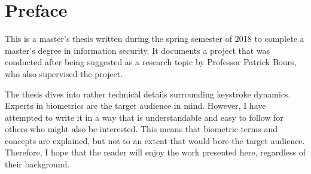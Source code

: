 \hypersetup{pageanchor=false}
%

\chapter*{Preface}
This is a master's thesis written during the spring semester of 2018 to complete a master's degree in information security.
It documents a project that was conducted after being suggested as a research topic by Professor Patrick Bours, who also supervised the project.

The thesis dives into rather technical details surrounding keystroke dynamics.
Experts in biometrics are the target audience in mind.
However, I have attempted to write it in a way that is understandable and easy to follow for others who might also be interested.
This means that biometric terms and concepts are explained, but not to an extent that would bore the target audience.
Therefore, I hope that the reader will enjoy the work presented here, regardless of their background.




%

